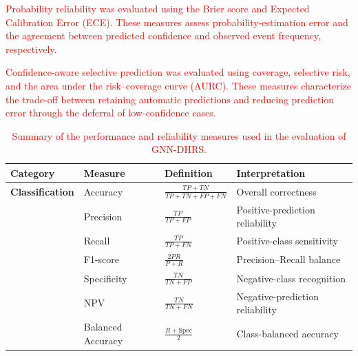 \documentclass[pdflatex,sn-mathphys-num]{sn-jnl}%
\theoremstyle{thmstyleone}%
\theoremstyle{thmstyletwo}%
\theoremstyle{thmstylethree}%
\begin{document}
\textcolor{red}{
Probability reliability was evaluated using the Brier score and Expected
Calibration Error (ECE). These measures assess probability-estimation error
and the agreement between predicted confidence and observed event frequency,
respectively.
}

\textcolor{red}{
Confidence-aware selective prediction was evaluated using coverage, selective
risk, and the area under the risk--coverage curve (AURC). These measures
characterize the trade-off between retaining automatic predictions and
reducing prediction error through the deferral of low-confidence cases.
}

\begin{table}[!ht]
\centering
\caption{\textcolor{red}{
Summary of the performance and reliability measures used in the evaluation
of GNN-DHRS.
}}
\label{tab:evaluation_metrics}

\scriptsize
\setlength{\tabcolsep}{4pt}
\renewcommand{\arraystretch}{1.22}

\begin{tabularx}{\textwidth}{@{}
>{\raggedright\arraybackslash}p{2.2cm}
>{\raggedright\arraybackslash}p{2.0cm}
>{\centering\arraybackslash}p{5.2cm}
>{\raggedright\arraybackslash}X
@{}}

\toprule
\textbf{Category} &
\textbf{Measure} &
\textbf{Definition} &
\textbf{Interpretation} \\
\midrule

\textbf{Classification}
&
Accuracy
&
\(\displaystyle
\frac{TP+TN}{TP+TN+FP+FN}
\)
&
Overall correctness
\\

&
Precision
&
\(\displaystyle
\frac{TP}{TP+FP}
\)
&
Positive-prediction reliability
\\

&
Recall
&
\(\displaystyle
\frac{TP}{TP+FN}
\)
&
Positive-class sensitivity
\\

&
F1-score
&
\(\displaystyle
\frac{2PR}{P+R}
\)
&
Precision--Recall balance
\\

&
Specificity
&
\(\displaystyle
\frac{TN}{TN+FP}
\)
&
Negative-class recognition
\\

&
NPV
&
\(\displaystyle
\frac{TN}{TN+FN}
\)
&
Negative-prediction reliability
\\

&
Balanced Accuracy
&
\(\displaystyle
\frac{R+\mathrm{Spec}}{2}
\)
&
Class-balanced accuracy
\\


\end{tabularx}
\end{table}
\end{document}
